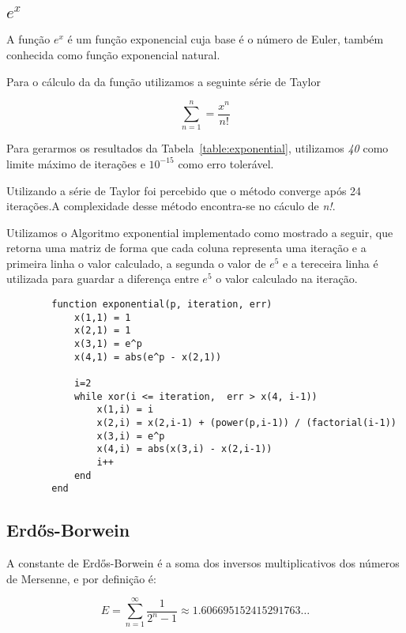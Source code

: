		

	\subsection{$e^x$}

		A função $e^x$ é um função exponencial cuja base é o número de Euler,
		também conhecida como função exponencial natural.

		Para o cálculo da da função utilizamos a seguinte série de Taylor

		\begin{equation}
			\sum_{n=1}^{n} = \frac{x^n}{n!}
		\end{equation}

		Para gerarmos os resultados da Tabela~\ref{table:exponential},
		utilizamos \emph{40} como limite máximo de iterações e $10^{-15}$ como erro
		tolerável.

		

		Utilizando a série de Taylor foi percebido que o método converge após 24
		iterações.A complexidade desse método encontra-se no cáculo de
		\emph{n!}.

		Utilizamos o Algoritmo exponential implementado como mostrado a seguir,
		que retorna uma matriz de forma que cada coluna representa uma iteração
		e a primeira linha o valor calculado, a segunda o valor de $e^5$ e a
		tereceira linha é utilizada para guardar a diferença entre $e^5$ o valor
		calculado na iteração.

		\newpage

		\begin{lstlisting}
		function exponential(p, iteration, err)
			x(1,1) = 1
			x(2,1) = 1
			x(3,1) = e^p
			x(4,1) = abs(e^p - x(2,1))

			i=2
			while xor(i <= iteration,  err > x(4, i-1))
				x(1,i) = i
				x(2,i) = x(2,i-1) + (power(p,i-1)) / (factorial(i-1))
				x(3,i) = e^p
				x(4,i) = abs(x(3,i) - x(2,i-1))
				i++
			end
		end
		\end{lstlisting}

	\subsection{Erdős-Borwein}

		A constante de Erdős-Borwein é a soma dos inversos multiplicativos dos
		números de Mersenne, e por definição é:

		\begin{equation}
			E = \displaystyle\sum_{n=1}^{\infty} \frac{1}{2^n-1} \approx 1.606695152415291763\dots
		\end{equation}

